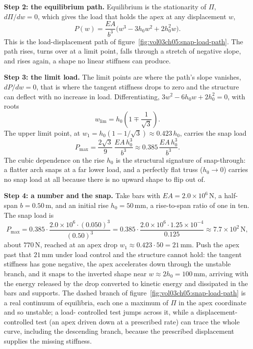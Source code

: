 

\textbf{Step 2: the equilibrium path.} Equilibrium is the stationarity of
$\Pi$, $d\Pi/dw = 0$, which gives the load that holds the apex at any
displacement $w$,
\[
P(w) = \frac{EA}{b^3}\bigl(w^3 - 3h_0 w^2 + 2h_0^2 w\bigr).
\]
This is the load-displacement path of
figure~\ref{fig:vol03ch05:snap-load-path}. The path rises, turns over at a
limit point, falls through a stretch of negative slope, and rises again, a
shape no linear stiffness can produce.



\textbf{Step 3: the limit load.} The limit points are where the path's slope
vanishes, $dP/dw = 0$, that is where the tangent stiffness drops to zero and
the structure can deflect with no increase in load. Differentiating,
$3w^2 - 6h_0 w + 2h_0^2 = 0$, with roots
\[
w_\text{lim} = h_0\left(1 \mp \frac{1}{\sqrt3}\right).
\]
The upper limit point, at $w_1 = h_0(1 - 1/\sqrt3) \approx 0.423\,h_0$,
carries the snap load
\[
P_\text{max} = \frac{2\sqrt3}{9}\,\frac{EA\,h_0^3}{b^3}
\approx 0.385\,\frac{EA\,h_0^3}{b^3}.
\]
The cubic dependence on the rise $h_0$ is the structural signature of
snap-through: a flatter arch snaps at a far lower load, and a perfectly flat
truss ($h_0 \to 0$) carries no snap load at all because there is no upward
shape to flip out of.

\textbf{Step 4: a number and the snap.} Take bars with $EA = 2.0\times
10^{6}\,\si{\newton}$, a half-span $b = 0.50\,\si{\meter}$, and an initial
rise $h_0 = 50\,\si{\milli\meter}$, a rise-to-span ratio of one in ten. The
snap load is
\[
P_\text{max} = 0.385\cdot\frac{2.0\times 10^{6}\cdot (0.050)^3}{(0.50)^3}
= 0.385\cdot\frac{2.0\times 10^{6}\cdot 1.25\times 10^{-4}}{0.125}
\approx 7.7\times 10^{2}\,\si{\newton},
\]
about $770\,\si{\newton}$, reached at an apex drop $w_1 \approx 0.423\cdot 50
= 21\,\si{\milli\meter}$. Push the apex past that $21\,\si{\milli\meter}$
under load control and the structure cannot hold: the tangent stiffness has
gone negative, the apex accelerates down through the unstable branch, and it
snaps to the inverted shape near $w \approx 2h_0 = 100\,\si{\milli\meter}$,
arriving with the energy released by the drop converted to kinetic energy and
dissipated in the bars and supports. The dashed branch of
figure~\ref{fig:vol03ch05:snap-load-path} is a real continuum of equilibria,
each one a maximum of $\Pi$ in the apex coordinate and so unstable; a load-
controlled test jumps across it, while a displacement-controlled test (an
apex driven down at a prescribed rate) can trace the whole curve, including
the descending branch, because the prescribed displacement supplies the
missing stiffness.

